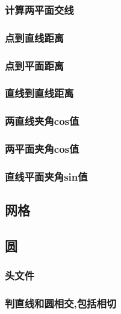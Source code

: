 \subsubsection{计算两平面交线}

\subsubsection{点到直线距离}

\subsubsection{点到平面距离}

\subsubsection{直线到直线距离}

\subsubsection{两直线夹角cos值}

\subsubsection{两平面夹角cos值}

\subsubsection{直线平面夹角sin值}


\subsection{网格}


\subsection{圆}
\subsubsection{头文件}

\subsubsection{判直线和圆相交,包括相切}

